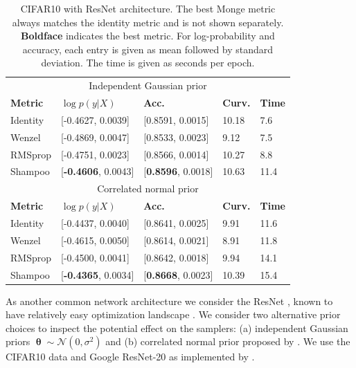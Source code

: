 \documentclass[10pt]{article} %
\DeclareMathOperator{\btheta}{\boldsymbol{\theta}}
\theoremstyle{plain}
\theoremstyle{definition}
\theoremstyle{remark}
\begin{document}
\begin{table}[t]
\centering
\begin{tabular}{l|llll}

\multicolumn{5}{c}{Independent Gaussian prior} \\
{\bf Metric}                   & $\log p(y|X)$  & {\bf Acc.}        & {\bf Curv.} & {\bf Time}\\
\hline
Identity & 
[-0.4627, 0.0039] & [0.8591, 0.0015] & 10.18 & 7.6 \\
Wenzel   & 
[-0.4869, 0.0047] & [0.8533, 0.0023] & 9.12  & 7.5  \\
RMSprop  &
[-0.4751, 0.0023] & [0.8566, 0.0014] & 10.27 & 8.8 \\
Shampoo  &
[{\bf -0.4606}, 0.0043] & [{\bf 0.8596}, 0.0018] & 10.63 & 11.4 \\
\multicolumn{5}{c}{Correlated normal prior} \\
{\bf Metric}                   & $\log p(y|X)$  & {\bf Acc.}        & {\bf Curv.} & {\bf Time}\\
\hline
Identity & 
[-0.4437, 0.0040] & [0.8641, 0.0025] & 9.91  & 11.6 \\
Wenzel   & 
[-0.4615, 0.0050] & [0.8614, 0.0021] & 8.91  & 11.8  \\
RMSprop  &
[-0.4500, 0.0041] & [0.8642, 0.0018] & 9.94  & 14.1 \\
Shampoo  &
[{\bf -0.4365}, 0.0034] & [{\bf 0.8668}, 0.0023] & 10.39 & 15.4 \\
\end{tabular}
\caption{CIFAR10 with ResNet architecture. The best Monge metric always matches the identity metric and is not shown separately. {\bf Boldface} indicates the best metric. For log-probability and accuracy, each entry is given as mean followed by standard deviation. The time is given as seconds per epoch.}
\label{table:cifar10}
\end{table}

As another common network architecture we consider the ResNet \citep{He2016}, known to have relatively easy optimization landscape \citep{Li2018}. We consider two alternative prior choices to inspect the potential effect on the samplers: (a) independent Gaussian priors $\btheta\sim\mathcal{N}(0,\sigma^{2})$ and (b) correlated normal prior proposed by \citet{Fortuin2022}. We use the CIFAR10 data \citep{Krizhevsky2009} and Google ResNet-20 as implemented by \citet{Fortuin2021}.
\end{document}
